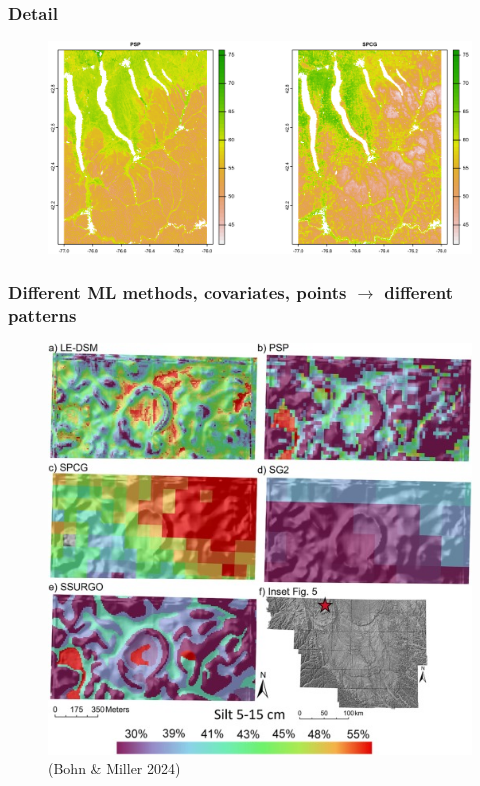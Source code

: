 \documentclass[aspectratio=169]{beamer}
\begin{document}
\begin{frame}
  \frametitle{Detail}
\begin{figure}
    \centering
    \includegraphics[height=0.72\textheight]{./graphics_david/Fig07b.png}
 \end{figure}
\end{frame}

\begin{frame}
  \frametitle{Different ML methods, covariates,  points $\to$ different patterns}
     \begin{figure}
        \centering
        \includegraphics[height=0.7\textheight]{./graphics_david/1-s2.0-S0016706124000107-gr12.jpg}
        \\(Bohn \& Miller 2024)
    \end{figure}
\end{frame}
\end{document}
